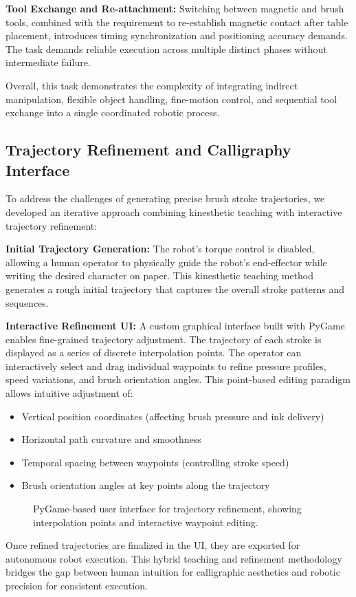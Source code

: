 \documentclass[11pt]{article}
\begin{document}
\textbf{Tool Exchange and Re-attachment:} Switching between magnetic and brush tools, combined with the requirement to re-establish magnetic contact after table placement, introduces timing synchronization and positioning accuracy demands. The task demands reliable execution across multiple distinct phases without intermediate failure.

Overall, this task demonstrates the complexity of integrating indirect manipulation, flexible object handling, fine-motion control, and sequential tool exchange into a single coordinated robotic process.

\subsection{Trajectory Refinement and Calligraphy Interface}

To address the challenges of generating precise brush stroke trajectories, we developed an iterative approach combining kinesthetic teaching with interactive trajectory refinement:

\textbf{Initial Trajectory Generation:} The robot's torque control is disabled, allowing a human operator to physically guide the robot's end-effector while writing the desired character on paper. This kinesthetic teaching method generates a rough initial trajectory that captures the overall stroke patterns and sequences.

\textbf{Interactive Refinement UI:} A custom graphical interface built with PyGame enables fine-grained trajectory adjustment. The trajectory of each stroke is displayed as a series of discrete interpolation points. The operator can interactively select and drag individual waypoints to refine pressure profiles, speed variations, and brush orientation angles. This point-based editing paradigm allows intuitive adjustment of:

\begin{itemize}
\item Vertical position coordinates (affecting brush pressure and ink delivery)
\item Horizontal path curvature and smoothness
\item Temporal spacing between waypoints (controlling stroke speed)
\item Brush orientation angles at key points along the trajectory
\end{itemize}

\begin{figure}[H]
\centering
\fbox{\rule{0pt}{5cm}\rule{10cm}{0pt}}
\caption{PyGame-based user interface for trajectory refinement, showing interpolation points and interactive waypoint editing.}
\end{figure}

Once refined trajectories are finalized in the UI, they are exported for autonomous robot execution. This hybrid teaching and refinement methodology bridges the gap between human intuition for calligraphic aesthetics and robotic precision for consistent execution.
\end{document}

